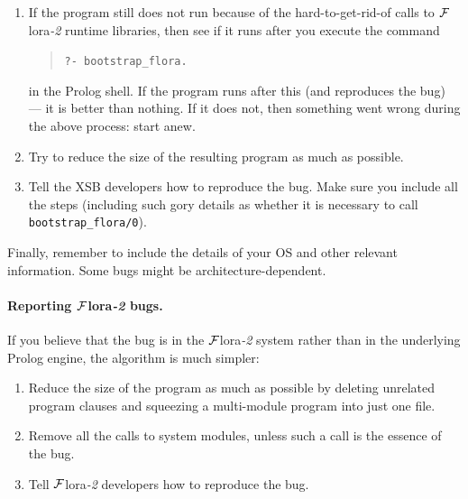 \documentclass[11pt]{article}
\newcommand{\FLORA}{{\mbox{\sc ${\cal F}${lora}\rm\emph{-2}}}\xspace}
\begin{document}
\begin{enumerate}
    Other calls that are often no longer needed in the dumped code are
    those that load \FLORA runtime libraries (which we are trying to
    eliminate!). These calls have the form
    \begin{verbatim}
   ?- flora_load_library(...).      
    \end{verbatim}
    If there are other calls to \FLORA runtime libraries, try to delete
    them, but make sure that the bug is still reproducible.
  \item If the program still does not run because of the hard-to-get-rid-of
    calls to \FLORA runtime libraries, then see if it runs after you
    execute the command
    \begin{quote}
       {\tt ?- bootstrap\_flora.}      
    \end{quote}
    in the Prolog shell. If the program runs after this (and reproduces the
    bug) --- it is better than nothing. If it does not, then something went
    wrong during the above process: start anew.
  \item Try to reduce the size of the resulting program as much as possible.
  \item Tell the XSB developers how to reproduce the bug. Make sure you
    include all the steps (including such gory details as whether it is
    necessary to call {\tt bootstrap\_flora/0}).
\end{enumerate}
Finally, remember to include the details of your OS and other relevant
information. Some bugs might be architecture-dependent.

\paragraph{Reporting \FLORA bugs.}
If you believe that the bug is in the \FLORA system rather than in the
underlying Prolog engine, the algorithm is much simpler: 
\begin{enumerate}
  \item Reduce the size of the program as much as possible by deleting 
    unrelated program clauses and squeezing a multi-module program into
    just one file.
  \item Remove all the calls to system modules, unless such a call is
    the essence of the bug.
  \item Tell \FLORA developers how to reproduce the bug.
\end{enumerate}
\end{document}
